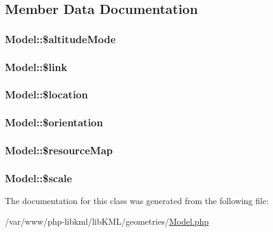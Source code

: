 \subsection{Member Data Documentation}
\hypertarget{classModel_a06d61df06c3eaf3b93ee4b0cf68e8902}{
\subsubsection[{\$altitudeMode}]{\setlength{\rightskip}{0pt plus 5cm}Model::\$altitudeMode}}
\label{d6/d18/classModel_a06d61df06c3eaf3b93ee4b0cf68e8902}
\hypertarget{classModel_ad2f6d36aa12d03dbb95dc69b15ba97a7}{
\subsubsection[{\$link}]{\setlength{\rightskip}{0pt plus 5cm}Model::\$link}}
\label{d6/d18/classModel_ad2f6d36aa12d03dbb95dc69b15ba97a7}
\hypertarget{classModel_a70f4c7ba95e13df59daad4bd7158fe1c}{
\subsubsection[{\$location}]{\setlength{\rightskip}{0pt plus 5cm}Model::\$location}}
\label{d6/d18/classModel_a70f4c7ba95e13df59daad4bd7158fe1c}
\hypertarget{classModel_ae52867ece7af6ed10f06b191c15ab0ae}{
\subsubsection[{\$orientation}]{\setlength{\rightskip}{0pt plus 5cm}Model::\$orientation}}
\label{d6/d18/classModel_ae52867ece7af6ed10f06b191c15ab0ae}
\hypertarget{classModel_af21f76ac7d10efcb052b1e11be6ce910}{
\subsubsection[{\$resourceMap}]{\setlength{\rightskip}{0pt plus 5cm}Model::\$resourceMap}}
\label{d6/d18/classModel_af21f76ac7d10efcb052b1e11be6ce910}
\hypertarget{classModel_af7ebafa9414f9d65bbf565cdc47e6d28}{
\subsubsection[{\$scale}]{\setlength{\rightskip}{0pt plus 5cm}Model::\$scale}}
\label{d6/d18/classModel_af7ebafa9414f9d65bbf565cdc47e6d28}


The documentation for this class was generated from the following file:\begin{DoxyCompactItemize}
\item 
/var/www/php-\/libkml/libKML/geometries/\hyperlink{Model_8php}{Model.php}\end{DoxyCompactItemize}
